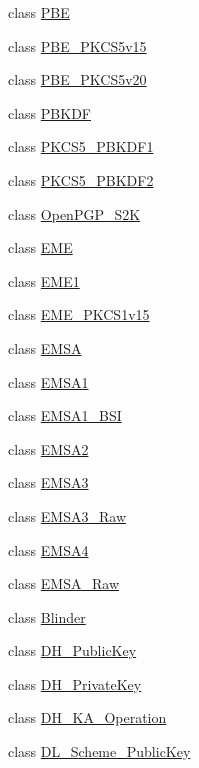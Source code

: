 \begin{DoxyCompactItemize}
\item 
class \hyperlink{classBotan_1_1PBE}{P\-B\-E}
\item 
class \hyperlink{classBotan_1_1PBE__PKCS5v15}{P\-B\-E\-\_\-\-P\-K\-C\-S5v15}
\item 
class \hyperlink{classBotan_1_1PBE__PKCS5v20}{P\-B\-E\-\_\-\-P\-K\-C\-S5v20}
\item 
class \hyperlink{classBotan_1_1PBKDF}{P\-B\-K\-D\-F}
\item 
class \hyperlink{classBotan_1_1PKCS5__PBKDF1}{P\-K\-C\-S5\-\_\-\-P\-B\-K\-D\-F1}
\item 
class \hyperlink{classBotan_1_1PKCS5__PBKDF2}{P\-K\-C\-S5\-\_\-\-P\-B\-K\-D\-F2}
\item 
class \hyperlink{classBotan_1_1OpenPGP__S2K}{Open\-P\-G\-P\-\_\-\-S2\-K}
\item 
class \hyperlink{classBotan_1_1EME}{E\-M\-E}
\item 
class \hyperlink{classBotan_1_1EME1}{E\-M\-E1}
\item 
class \hyperlink{classBotan_1_1EME__PKCS1v15}{E\-M\-E\-\_\-\-P\-K\-C\-S1v15}
\item 
class \hyperlink{classBotan_1_1EMSA}{E\-M\-S\-A}
\item 
class \hyperlink{classBotan_1_1EMSA1}{E\-M\-S\-A1}
\item 
class \hyperlink{classBotan_1_1EMSA1__BSI}{E\-M\-S\-A1\-\_\-\-B\-S\-I}
\item 
class \hyperlink{classBotan_1_1EMSA2}{E\-M\-S\-A2}
\item 
class \hyperlink{classBotan_1_1EMSA3}{E\-M\-S\-A3}
\item 
class \hyperlink{classBotan_1_1EMSA3__Raw}{E\-M\-S\-A3\-\_\-\-Raw}
\item 
class \hyperlink{classBotan_1_1EMSA4}{E\-M\-S\-A4}
\item 
class \hyperlink{classBotan_1_1EMSA__Raw}{E\-M\-S\-A\-\_\-\-Raw}
\item 
class \hyperlink{classBotan_1_1Blinder}{Blinder}
\item 
class \hyperlink{classBotan_1_1DH__PublicKey}{D\-H\-\_\-\-Public\-Key}
\item 
class \hyperlink{classBotan_1_1DH__PrivateKey}{D\-H\-\_\-\-Private\-Key}
\item 
class \hyperlink{classBotan_1_1DH__KA__Operation}{D\-H\-\_\-\-K\-A\-\_\-\-Operation}
\item 
class \hyperlink{classBotan_1_1DL__Scheme__PublicKey}{D\-L\-\_\-\-Scheme\-\_\-\-Public\-Key}
\item 

\end{DoxyCompactItemize}
